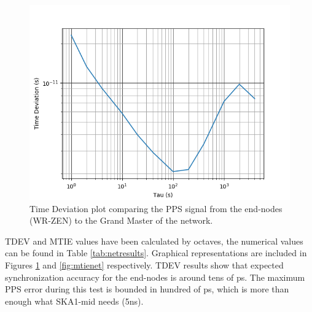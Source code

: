 \begin{figure}
	\centering
	\includegraphics[width=0.9\linewidth]{img/tdev_exp3}
	\caption[TDEV of the end-nodes in the scalability test.]{Time Deviation 
	plot comparing the PPS signal from the end-nodes (WR-ZEN) to the Grand 
	Master of the network.}
	\label{fig:tdevnet}
\end{figure}

TDEV and MTIE values have been calculated by octaves, the numerical values can 
be found in Table \ref{tab:netresults}. Graphical representations are included 
in Figures \ref{fig:tdevnet} and \ref{fig:mtienet} respectively. TDEV results 
show that expected synchronization accuracy for the end-nodes is around tens of 
ps. The maximum PPS error during this test is bounded in hundred of ps, which 
is more than enough what SKA1-mid needs (5ns).


